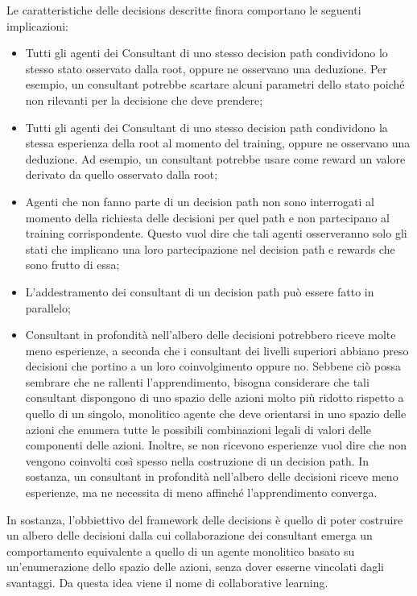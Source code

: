 \documentclass[conference]{IEEEtran}
\begin{document}
Le caratteristiche delle decisions descritte finora comportano
le seguenti implicazioni:
\begin{itemize}
    \item Tutti gli agenti dei Consultant di uno stesso decision path condividono
    lo stesso stato osservato dalla root, oppure ne osservano una deduzione.
    Per esempio, un consultant potrebbe scartare alcuni parametri dello stato
    poiché non rilevanti per la decisione che deve prendere;
    \item Tutti gli agenti dei Consultant di uno stesso decision path condividono
    la stessa esperienza della root al momento del training, oppure ne osservano
    una deduzione. Ad esempio, un consultant potrebbe
    usare come reward un valore derivato da quello osservato dalla root;
    \item Agenti che non fanno parte di un decision path non sono interrogati al momento
    della richiesta delle decisioni per quel path e non partecipano al training corrispondente.
    Questo vuol dire che tali agenti osserveranno solo gli stati che implicano una loro
    partecipazione nel decision path e rewards che sono frutto di essa;
    \item L'addestramento dei consultant di un decision path può essere fatto in parallelo;
    \item Consultant in profondità nell'albero delle decisioni potrebbero riceve molte meno
    esperienze, a seconda che i consultant dei livelli superiori abbiano preso decisioni
    che portino a un loro coinvolgimento oppure no. Sebbene ciò possa sembrare che ne rallenti
    l'apprendimento, bisogna considerare che tali consultant dispongono di uno spazio delle azioni
    molto più ridotto rispetto a quello di un singolo, monolitico agente che deve orientarsi
    in uno spazio delle azioni che enumera tutte le possibili combinazioni legali di valori
    delle componenti delle azioni. Inoltre, se non ricevono esperienze vuol dire che
    non vengono coinvolti così spesso nella costruzione di un decision path. In sostanza,
    un consultant in profondità nell'albero delle decisioni riceve meno esperienze, ma
    ne necessita di meno affinché l'apprendimento converga.
\end{itemize}

In sostanza, l'obbiettivo del framework delle decisions è quello di poter costruire un albero
delle decisioni dalla cui collaborazione dei consultant emerga un comportamento
equivalente a quello di un agente monolitico basato su un'enumerazione dello spazio
delle azioni, senza dover esserne vincolati dagli svantaggi. Da questa idea
viene il nome di collaborative learning.
\end{document}
